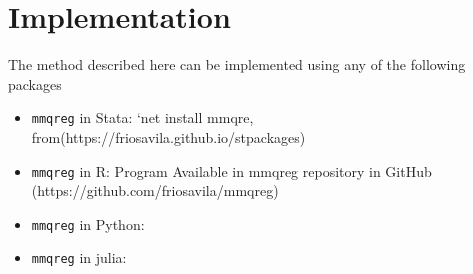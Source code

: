 \documentclass[
  authoryear,
  review,
  1p]{elsarticle}
\providecommand{\tightlist}{%
  \setlength{\itemsep}{0pt}\setlength{\parskip}{0pt}}\usepackage{longtable,booktabs,array}
\begin{document}
\hypertarget{implementation}{%
\section{Implementation}\label{implementation}}

The method described here can be implemented using any of the following
packages

\begin{itemize}
\tightlist
\item
  \texttt{mmqreg} in Stata: `net install mmqre,
  from(https://friosavila.github.io/stpackages)
\item
  \texttt{mmqreg} in R: Program Available in mmqreg repository in GitHub
  (https://github.com/friosavila/mmqreg)
\item
  \texttt{mmqreg} in Python:
\item
  \texttt{mmqreg} in julia:
\end{itemize}
\end{document}
